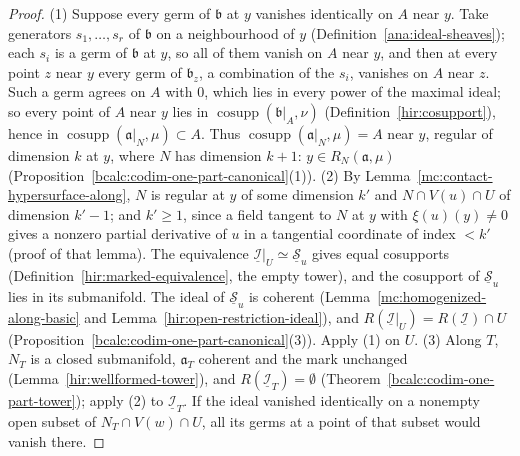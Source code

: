 \begin{proof}
\mixedleanok
(1) Suppose every germ of \(\mathfrak b\) at \(y\) vanishes identically on \(A\) near \(y\). Take generators \(s_1,\dots,s_r\) of \(\mathfrak b\) on a neighbourhood of \(y\)
(Definition~\ref{ana:ideal-sheaves}); each \(s_i\) is a germ of \(\mathfrak b\) at \(y\), so all of them vanish on \(A\) near \(y\), and then at every point \(z\) near \(y\) every germ
of \(\mathfrak b_z\), a combination of the \(s_i\), vanishes on \(A\) near \(z\). Such a germ agrees on \(A\) with \(0\), which lies in every power of the maximal ideal; so
every point of \(A\) near \(y\) lies in \(\operatorname{cosupp}(\mathfrak b|_A,\nu)\) (Definition~\ref{hir:cosupport}), hence in \(\operatorname{cosupp}(\mathfrak a|_N,\mu)\subset A\).
Thus \(\operatorname{cosupp}(\mathfrak a|_N,\mu)=A\) near \(y\), regular of dimension \(k\) at \(y\), where \(N\) has dimension \(k+1\): \(y\in R_N(\mathfrak a,\mu)\)
(Proposition~\ref{bcalc:codim-one-part-canonical}(1)).
(2) By Lemma~\ref{mc:contact-hypersurface-along}, \(N\) is regular at \(y\) of some dimension \(k'\) and \(N\cap V(u)\cap U\) of dimension \(k'-1\); and \(k'\ge1\), since a field
tangent to \(N\) at \(y\) with \(\xi(u)(y)\ne0\) gives a nonzero partial derivative of \(u\) in a tangential coordinate of index \(<k'\) (proof of that lemma). The equivalence
\(\underline{\mathcal I}|_U\simeq\underline{\mathcal S}_u\) gives equal cosupports (Definition~\ref{hir:marked-equivalence}, the empty tower), and the cosupport of
\(\underline{\mathcal S}_u\) lies in its submanifold. The ideal of \(\underline{\mathcal S}_u\) is coherent (Lemma~\ref{mc:homogenized-along-basic} and
Lemma~\ref{hir:open-restriction-ideal}), and \(R(\underline{\mathcal I}|_U)=R(\underline{\mathcal I})\cap U\) (Proposition~\ref{bcalc:codim-one-part-canonical}(3)). Apply (1) on \(U\).
(3) Along \(T\), \(N_T\) is a closed submanifold, \(\mathfrak a_T\) coherent and the mark unchanged (Lemma~\ref{hir:wellformed-tower}), and \(R(\underline{\mathcal I}_T)=\emptyset\)
(Theorem~\ref{bcalc:codim-one-part-tower}); apply (2) to \(\underline{\mathcal I}_T\). If the ideal vanished identically on a nonempty open subset of
\(N_T\cap V(w)\cap U\), all its germs at a point of that subset would vanish there.
\end{proof}

